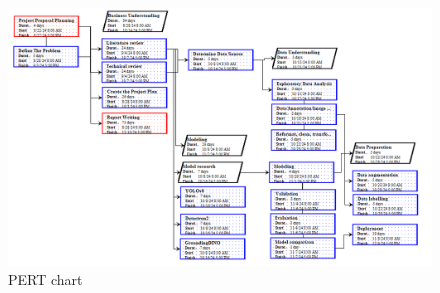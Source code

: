 \documentclass[stu,12pt,floatsintext]{apa7}
\begin{document}
\begin{figure}
	\centering
	\includegraphics[width=\linewidth]{images/pert.png}
	\caption{PERT chart}
	\label{fig:pert}
\end{figure}
\end{document}
